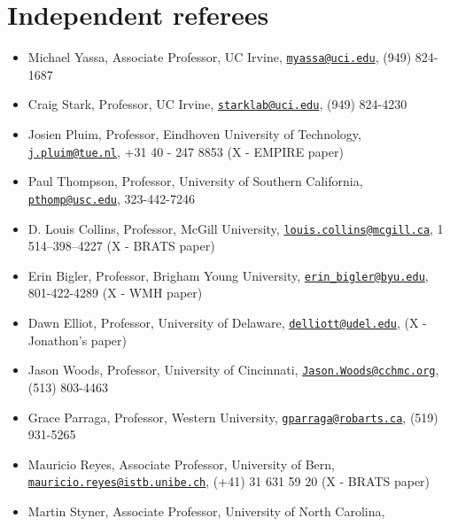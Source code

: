 \documentclass[12pt,]{article}
\title{}
\author{}
\date{}
\providecommand{\tightlist}{%
  \setlength{\itemsep}{0pt}\setlength{\parskip}{0pt}}
\begin{document}
\maketitle


\section{Independent referees}\label{independent-referees}

\begin{itemize}
\tightlist
\item
  Michael Yassa, Associate Professor, UC Irvine,
  \href{mailto:myassa@uci.edu}{\nolinkurl{myassa@uci.edu}}, (949)
  824-1687
\item
  Craig Stark, Professor, UC Irvine,
  \href{mailto:starklab@uci.edu}{\nolinkurl{starklab@uci.edu}}, (949)
  824-4230
\item
  Josien Pluim, Professor, Eindhoven University of Technology,
  \href{mailto:j.pluim@tue.nl}{\nolinkurl{j.pluim@tue.nl}}, +31 40 - 247
  8853 (X - EMPIRE paper)
\item
  Paul Thompson, Professor, University of Southern California,
  \href{mailto:pthomp@usc.edu}{\nolinkurl{pthomp@usc.edu}}, 323-442-7246
\item
  D. Louis Collins, Professor, McGill University,
  \href{mailto:louis.collins@mcgill.ca}{\nolinkurl{louis.collins@mcgill.ca}},
  1 514--398--4227 (X - BRATS paper)
\item
  Erin Bigler, Professor, Brigham Young University,
  \href{mailto:erin_bigler@byu.edu}{\nolinkurl{erin\_bigler@byu.edu}},
  801-422-4289 (X - WMH paper)
\item
  Dawn Elliot, Professor, University of Delaware,
  \href{mailto:delliott@udel.edu}{\nolinkurl{delliott@udel.edu}}, (X -
  Jonathon's paper)
\item
  Jason Woods, Professor, University of Cincinnati,
  \href{mailto:Jason.Woods@cchmc.org}{\nolinkurl{Jason.Woods@cchmc.org}},
  (513) 803-4463
\item
  Grace Parraga, Professor, Western University,
  \href{mailto:gparraga@robarts.ca}{\nolinkurl{gparraga@robarts.ca}},
  (519) 931-5265
\item
  Mauricio Reyes, Associate Professor, University of Bern,
  \href{mailto:mauricio.reyes@istb.unibe.ch}{\nolinkurl{mauricio.reyes@istb.unibe.ch}},
  (+41) 31 631 59 20 (X - BRATS paper)
\item
  Martin Styner, Associate Professor, University of North Carolina,

\end{itemize}
\end{document}
